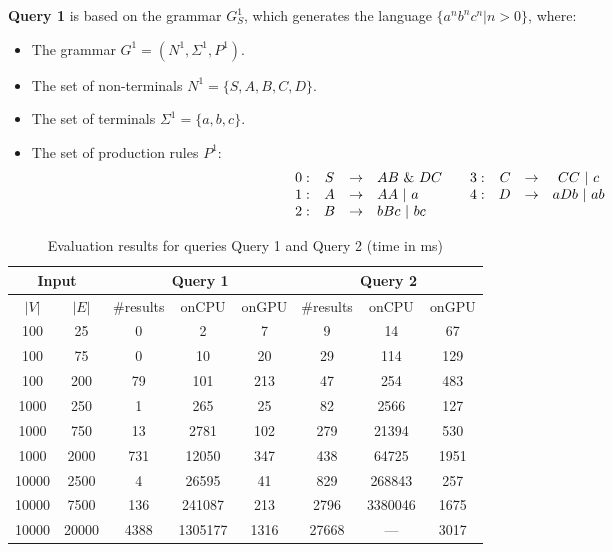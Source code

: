 \textbf{Query 1} is based on the grammar $G^1_S$, which generates the language $\{a^n b^n c^n | n > 0\}$, where:
\begin{itemize}
    \item The grammar $G^1 = (N^1, \Sigma^1, P^1)$.
    \item The set of non-terminals $N^1 = \{S, A, B, C, D\}$.
    \item The set of terminals $\Sigma^1 = \{a, b, c\}.$
    \item The set of production rules $P^1$:
    \[
    \begin{array}{rcclrrccl}
    0: & S & \rightarrow & AB ~\& ~DC  \hfill & \quad 3: & C & \rightarrow & CC ~|~ c\\ 
    1: & A & \rightarrow & AA ~|~ a \hfill &\quad     4: & D & \rightarrow & aDb ~|~ ab \\ 
    2: & B & \rightarrow & bBc ~|~ bc \\
    \end{array}
    \]
\end{itemize}
\begin{table*}
    \centering
    \caption{Evaluation results for queries Query 1 and Query 2 (time in ms)}
    \label{tbl1}
    
    \begin{tabular}{ | c | c || c | c | c || c | c | c |}
        \hline
        \multicolumn{2}{|c||}{Input} & \multicolumn{3}{|c||}{Query 1} & \multicolumn{3}{|c|}{Query 2} \\
        \hline
        $|V|$ & $|E|$ & \#results & onCPU & onGPU & \#results & onCPU & onGPU \\
        \hline 
        \hline
        100 & 25 & 0 & 2 & 7 & 9 & 14 & 67\\
        100 & 75 & 0 & 10 & 20 & 29 & 114 & 129\\
        100 & 200 & 79 & 101 & 213 & 47 & 254 & 483\\
        1000  & 250 & 1 & 265 & 25 & 82 & 2566 & 127\\
        1000 & 750 & 13 & 2781 & 102 & 279 & 21394 & 530\\
        1000 & 2000 & 731 & 12050 & 347 & 438 & 64725 & 1951\\
        10000 & 2500 & 4 & 26595 & 41 & 829 & 268843 & 257\\
        10000 & 7500 & 136 & 241087 & 213 & 2796 & 3380046 & 1675\\
        10000 & 20000 & 4388 & 1305177 & 1316 & 27668 & --- & 3017\\
        \hline
    \end{tabular}
    
\end{table*}

